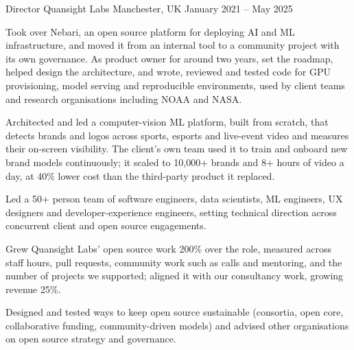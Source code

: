 \begin{cventries}
\cventry
{Director}
{Quansight Labs}
{Manchester, UK}
{January 2021 -- May 2025}
{
\begin{cvitems}
  \item {Took over Nebari, an open source platform for deploying AI and ML infrastructure, and moved it from an internal tool to a community project with its own governance. As product owner for around two years, set the roadmap, helped design the architecture, and wrote, reviewed and tested code for GPU provisioning, model serving and reproducible environments, used by client teams and research organisations including NOAA and NASA.}
  \item {Architected and led a computer-vision ML platform, built from scratch, that detects brands and logos across sports, esports and live-event video and measures their on-screen visibility. The client's own team used it to train and onboard new brand models continuously; it scaled to 10,000+ brands and 8+ hours of video a day, at 40\% lower cost than the third-party product it replaced.}
  \item {Led a 50+ person team of software engineers, data scientists, ML engineers, UX designers and developer-experience engineers, setting technical direction across concurrent client and open source engagements.}
  \item {Grew Quansight Labs' open source work 200\% over the role, measured across staff hours, pull requests, community work such as calls and mentoring, and the number of projects we supported; aligned it with our consultancy work, growing revenue 25\%.}
  \item {Designed and tested ways to keep open source sustainable (consortia, open core, collaborative funding, community-driven models) and advised other organisations on open source strategy and governance.}
\end{cvitems}
}


\end{cventries}
